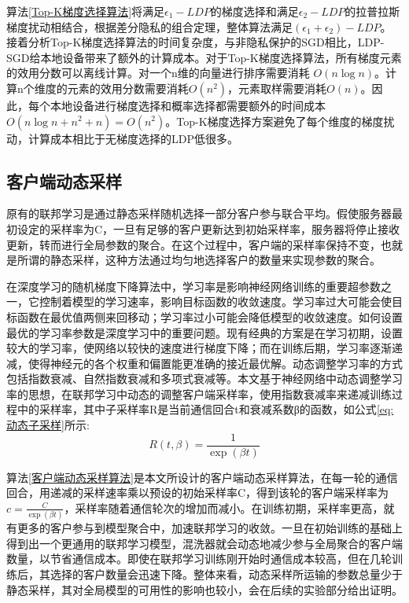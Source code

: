 算法\ref{Top-K梯度选择算法}将满足$\epsilon_{1}-LDP$的梯度选择和满足$\epsilon_{2}-LDP$的拉普拉斯梯度扰动相结合，根据差分隐私的组合定理，整体算法满足$\left(\epsilon_{1}+\epsilon_{2}\right)-LDP$。
接着分析Top-K梯度选择算法的时间复杂度，与非隐私保护的SGD相比，LDP-SGD给本地设备带来了额外的计算成本。对于Top-K梯度选择算法，所有梯度元素的效用分数可以离线计算。对一个n维的向量进行排序需要消耗 $O(n \log n)$。计算n个维度的元素的效用分数需要消耗$O\left(n^{2}\right)$，元素取样需要消耗$O(n)$。因此，每个本地设备进行梯度选择和概率选择都需要额外的时间成本$O\left(n \log n+n^{2}+n\right)=O\left(n^{2}\right)$。Top-K梯度选择方案避免了每个维度的梯度扰动，计算成本相比于无梯度选择的LDP低很多。

\subsection{客户端动态采样}
原有的联邦学习是通过静态采样随机选择一部分客户参与联合平均。假使服务器最初设定的采样率为C，一旦有足够的客户更新达到初始采样率，服务器将停止接收更新，转而进行全局参数的聚合。在这个过程中，客户端的采样率保持不变，也就是所谓的静态采样，这种方法通过均匀地选择客户的数量来实现参数的聚合。

在深度学习的随机梯度下降算法中，学习率是影响神经网络训练的重要超参数之一，它控制着模型的学习速率，影响目标函数的收敛速度。学习率过大可能会使目标函数在最优值两侧来回移动；学习率过小可能会降低模型的收敛速度。如何设置最优的学习率参数是深度学习中的重要问题。现有经典的方案是在学习初期，设置较大的学习率，使网络以较快的速度进行梯度下降；而在训练后期，学习率逐渐递减，使得神经元的各个权重和偏置能更准确的接近最优解。动态调整学习率的方式包括指数衰减、自然指数衰减和多项式衰减等。本文基于神经网络中动态调整学习率的思想，在联邦学习中动态的调整客户端采样率，使用指数衰减率来递减训练过程中的采样率，其中子采样率R是当前通信回合t和衰减系数β的函数，如公式\ref{eq:动态子采样}所示:
\begin{equation}\label{eq:动态子采样}
R(t, \beta)=\frac{1}{\exp (\beta t)}
\end{equation}

算法\ref{客户端动态采样算法}是本文所设计的客户端动态采样算法，在每一轮的通信回合，用递减的采样速率乘以预设的初始采样率C，得到该轮的客户端采样率为$c=\frac{C}{\exp (\beta t)}$，采样率随着通信轮次的增加而减小。在训练初期，采样率更高，就有更多的客户参与到模型聚合中，加速联邦学习的收敛。一旦在初始训练的基础上得到出一个更通用的联邦学习模型，混洗器就会动态地减少参与全局聚合的客户端数量，以节省通信成本。即使在联邦学习训练刚开始时通信成本较高，但在几轮训练后，其选择的客户数量会迅速下降。整体来看，动态采样所运输的参数总量少于静态采样，其对全局模型的可用性的影响也较小，会在后续的实验部分给出证明。

